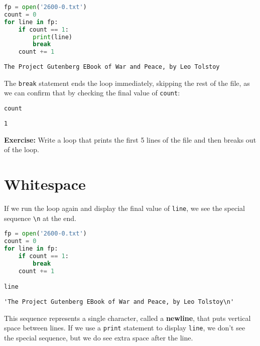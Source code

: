 \begin{lstlisting}[language=Python,style=source]
fp = open('2600-0.txt')
count = 0
for line in fp:
    if count == 1:
        print(line)
        break
    count += 1
\end{lstlisting}

\begin{lstlisting}[style=output]
The Project Gutenberg EBook of War and Peace, by Leo Tolstoy
\end{lstlisting}

The \passthrough{\lstinline!break!} statement ends the loop immediately,
skipping the rest of the file, as we can confirm that by checking the
final value of \passthrough{\lstinline!count!}:

\begin{lstlisting}[language=Python,style=source]
count
\end{lstlisting}

\begin{lstlisting}[style=output]
1
\end{lstlisting}

\textbf{Exercise:} Write a loop that prints the first 5 lines of the
file and then breaks out of the loop.

\section{Whitespace}\label{whitespace}

If we run the loop again and display the final value of
\passthrough{\lstinline!line!}, we see the special sequence
\passthrough{\lstinline!\\n!} at the end.

\begin{lstlisting}[language=Python,style=source]
fp = open('2600-0.txt')
count = 0
for line in fp:
    if count == 1:
        break
    count += 1

line
\end{lstlisting}

\begin{lstlisting}[style=output]
'The Project Gutenberg EBook of War and Peace, by Leo Tolstoy\n'
\end{lstlisting}

This sequence represents a single character, called a \textbf{newline},
that puts vertical space between lines. If we use a
\passthrough{\lstinline!print!} statement to display
\passthrough{\lstinline!line!}, we don't see the special sequence, but
we do see extra space after the line.

